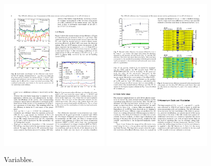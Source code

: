 \begin{figure}[tp]
  \centering
  \includegraphics[width=0.48\textwidth]{figures/performance/muon-efficiency}
  \includegraphics[width=0.48\textwidth]{figures/performance/muon-efficiency-etaphi}
  \caption{Variables.}
  \label{fig:strategy-objects-muon-efficiency}
\end{figure}

